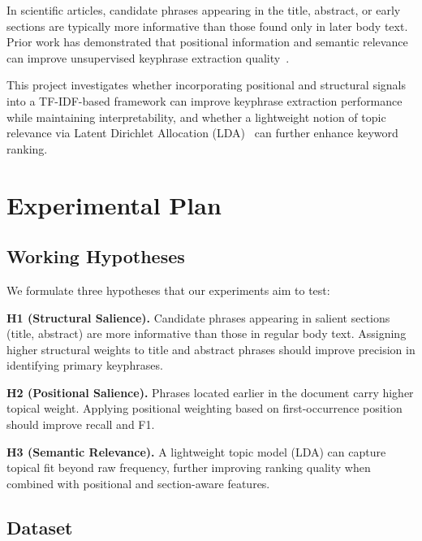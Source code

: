 \documentclass[pdflatex,sn-mathphys-num]{sn-jnl}
\begin{document}
In scientific articles, candidate phrases appearing in the title, abstract, or early sections are
typically more informative than those found only in later body text. Prior work has demonstrated that
positional information and semantic relevance can improve unsupervised keyphrase extraction
quality~\cite{florescu2017,patel2021,liang2021,ding2021,song2023}.

This project investigates whether incorporating positional and structural signals into a TF-IDF-based
framework can improve keyphrase extraction performance while maintaining interpretability, and whether
a lightweight notion of topic relevance via Latent Dirichlet Allocation
(LDA)~\cite{blei2003} can further enhance keyword ranking.

\section{Experimental Plan}\label{sec:plan}

\subsection{Working Hypotheses}\label{sec:hypotheses}

We formulate three hypotheses that our experiments aim to test:

\noindent\textbf{H1 (Structural Salience).}
Candidate phrases appearing in salient sections (title, abstract) are more informative than those in
regular body text. Assigning higher structural weights to title and abstract phrases should improve
precision in identifying primary keyphrases.

\noindent\textbf{H2 (Positional Salience).}
Phrases located earlier in the document carry higher topical weight. Applying positional weighting
based on first-occurrence position should improve recall and F1.

\noindent\textbf{H3 (Semantic Relevance).}
A lightweight topic model (LDA) can capture topical fit beyond raw frequency, further improving
ranking quality when combined with positional and section-aware features.

\subsection{Dataset}\label{sec:dataset}
\end{document}
